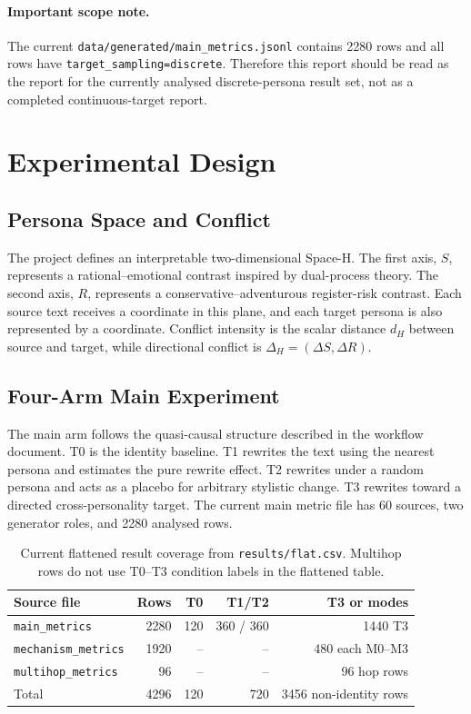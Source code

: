 \documentclass[sigconf,nonacm]{acmart}
\begin{document}
\paragraph{Important scope note.}
The current \texttt{data/generated/main\_metrics.jsonl} contains 2280 rows and all rows have \texttt{target\_sampling=discrete}.
Therefore this report should be read as the report for the currently analysed discrete-persona result set, not as a completed continuous-target report.

\section{Experimental Design}

\subsection{Persona Space and Conflict}

The project defines an interpretable two-dimensional Space-H.
The first axis, $S$, represents a rational--emotional contrast inspired by dual-process theory.
The second axis, $R$, represents a conservative--adventurous register-risk contrast.
Each source text receives a coordinate in this plane, and each target persona is also represented by a coordinate.
Conflict intensity is the scalar distance $d_H$ between source and target, while directional conflict is $\Delta_H=(\Delta S,\Delta R)$.

\subsection{Four-Arm Main Experiment}

The main arm follows the quasi-causal structure described in the workflow document.
T0 is the identity baseline.
T1 rewrites the text using the nearest persona and estimates the pure rewrite effect.
T2 rewrites under a random persona and acts as a placebo for arbitrary stylistic change.
T3 rewrites toward a directed cross-personality target.
The current main metric file has 60 sources, two generator roles, and 2280 analysed rows.

\begin{table}[t]
\centering
\small
\begin{tabular}{lrrrr}
\toprule
Source file & Rows & T0 & T1/T2 & T3 or modes \\
\midrule
\texttt{main\_metrics} & 2280 & 120 & 360 / 360 & 1440 T3 \\
\texttt{mechanism\_metrics} & 1920 & -- & -- & 480 each M0--M3 \\
\texttt{multihop\_metrics} & 96 & -- & -- & 96 hop rows \\
\midrule
Total & 4296 & 120 & 720 & 3456 non-identity rows \\
\bottomrule
\end{tabular}
\caption{Current flattened result coverage from \texttt{results/flat.csv}. Multihop rows do not use T0--T3 condition labels in the flattened table.}
\label{tab:coverage}
\end{table}
\end{document}
